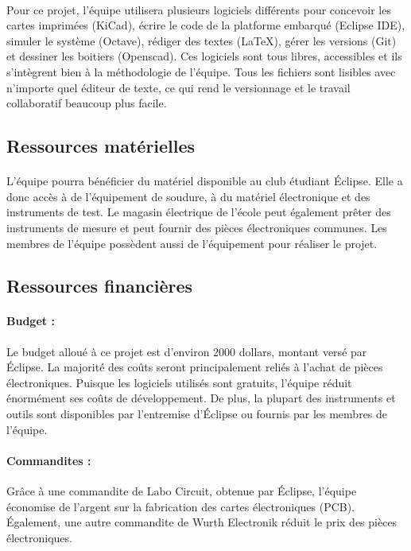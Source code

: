 	\paragraph{}
	Pour ce projet, l'équipe utilisera plusieurs logiciels différents pour concevoir les cartes imprimées (KiCad), écrire le code de la platforme embarqué (Eclipse IDE), simuler le système (Octave), rédiger des textes (LaTeX), gérer les versions (Git) et dessiner les boitiers (Openscad). Ces logiciels sont tous libres, accessibles et ils s'intègrent bien à la méthodologie de l'équipe. Tous les fichiers sont lisibles avec n'importe quel éditeur de texte, ce qui rend le versionnage et le travail collaboratif beaucoup plus facile.
	
	
	\subsection{Ressources matérielles}
	\paragraph{}
	L'équipe pourra bénéficier du matériel disponible au club étudiant Éclipse. Elle a donc accès à de l'équipement de soudure, à du matériel électronique et des instruments de test. Le magasin électrique de l'école peut également prêter des instruments de mesure et peut fournir des pièces électroniques communes. Les membres de l'équipe possèdent aussi de l'équipement pour réaliser le projet.
	
	\subsection{Ressources financières}
	
		\paragraph{Budget :}
		Le budget alloué à ce projet est d'environ 2000 dollars, montant versé par Éclipse. La majorité des coûts seront principalement reliés à l'achat de pièces électroniques. Puisque les logiciels utilisés sont gratuits, l'équipe réduit énormément ses coûts de développement. De plus, la plupart des instruments et outils sont disponibles par l'entremise d'Éclipse ou fournis par les membres de l'équipe.
		
		\paragraph{Commandites :}
		Grâce à une commandite de Labo Circuit, obtenue par Éclipse, l'équipe économise de l'argent sur la fabrication des cartes électroniques (PCB). Également, une autre commandite de Wurth Electronik réduit le prix des pièces électroniques.
